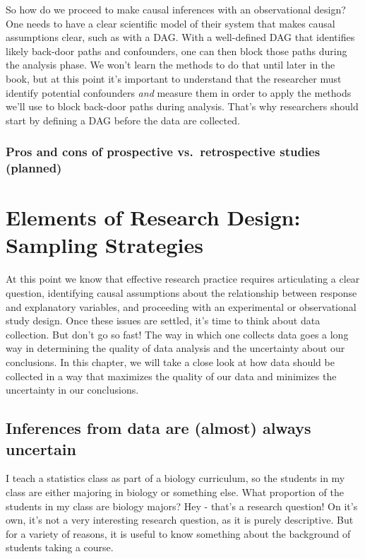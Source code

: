\documentclass[
]{book}
\begin{document}
So how do we proceed to make causal inferences with an observational design? One needs to have a clear scientific model of their system that makes causal assumptions clear, such as with a DAG. With a well-defined DAG that identifies likely back-door paths and confounders, one can then block those paths during the analysis phase. We won't learn the methods to do that until later in the book, but at this point it's important to understand that the researcher must identify potential confounders \emph{and} measure them in order to apply the methods we'll use to block back-door paths during analysis. That's why researchers should start by defining a DAG before the data are collected.

\subsection{Pros and cons of prospective vs.~retrospective studies (planned)}\label{pros-and-cons-of-prospective-vs.-retrospective-studies-planned}

\chapter{Elements of Research Design: Sampling Strategies}\label{elements-of-research-design-sampling-strategies}

At this point we know that effective research practice requires articulating a clear question, identifying causal assumptions about the relationship between response and explanatory variables, and proceeding with an experimental or observational study design. Once these issues are settled, it's time to think about data collection. But don't go so fast! The way in which one collects data goes a long way in determining the quality of data analysis and the uncertainty about our conclusions. In this chapter, we will take a close look at how data should be collected in a way that maximizes the quality of our data and minimizes the uncertainty in our conclusions.

\section{Inferences from data are (almost) always uncertain}\label{inferences-from-data-are-almost-always-uncertain}

I teach a statistics class as part of a biology curriculum, so the students in my class are either majoring in biology or something else. What proportion of the students in my class are biology majors? Hey - that's a research question! On it's own, it's not a very interesting research question, as it is purely descriptive. But for a variety of reasons, it is useful to know something about the background of students taking a course.
\end{document}
